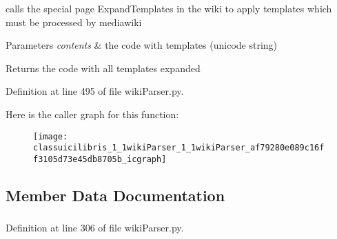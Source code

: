 calls the special page \-Expand\-Templates in the wiki to apply templates which must be processed by mediawiki 


\begin{DoxyParams}{\-Parameters}
{\em contents} & the code with templates (unicode string) \\
\hline
\end{DoxyParams}
\begin{DoxyReturn}{\-Returns}
the code with all templates expanded 
\end{DoxyReturn}


\-Definition at line 495 of file wiki\-Parser.\-py.



\-Here is the caller graph for this function\-:
\nopagebreak
\begin{figure}[H]
\begin{center}
\leavevmode
\texttt{[image: classuicilibris\_1\_1wikiParser\_1\_1wikiParser\_af79280e089c16ff3105d73e45db8705b\_icgraph]}
\end{center}
\end{figure}




\subsection{\-Member \-Data \-Documentation}
\hypertarget{classuicilibris_1_1wikiParser_1_1wikiParser_ab7f4d7c5562ce8d2649a9215aca2c351}{
\subsubsection[{base\-Address}]{}}\label{classuicilibris_1_1wikiParser_1_1wikiParser_ab7f4d7c5562ce8d2649a9215aca2c351}


\-Definition at line 306 of file wiki\-Parser.\-py.

\hypertarget{classuicilibris_1_1wikiParser_1_1wikiParser_a82888a48bdef33d5201bdb74ba1a8bd0}{
\subsubsection[{cache}]{}}\label{classuicilibris_1_1wikiParser_1_1wikiParser_a82888a48bdef33d5201bdb74ba1a8bd0}


